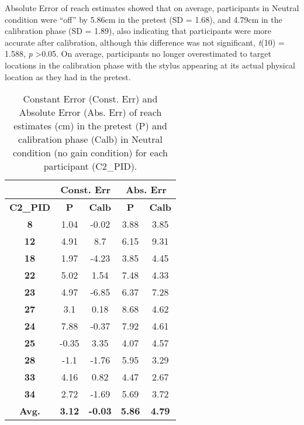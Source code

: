 Absolute Error of reach estimates showed that on average, participants in Neutral condition were “off” by 5.86cm in the pretest (SD = 1.68), and 4.79cm in the calibration phase (SD = 1.89), also indicating that participants were more accurate after calibration, although this difference was not significant, \textit{t}(10) = 1.588, \textit{p} \textgreater 0.05. On average, participants no longer overestimated to target locations in the calibration phase with the stylus appearing at its actual physical location as they had in the pretest.

\begin{table}[h]
	\centering
	\begin{center}
		\begin{tabular}{|c|c|c|c|c|}
			
			\hline
			& \multicolumn{2}{|c}{\textbf{Const. Err}} & \multicolumn{2}{|c|}{\textbf{Abs. Err}} \\ \hline
			\textbf{C2\_PID} & \textbf{P}  & \textbf{Calb}  & \textbf{P}  & \textbf{Calb}  \\ \hline
			\textbf{8}      & 1.04        & -0.02         & 3.88        & 3.85          \\ \hline
			\textbf{12}     & 4.91        & 8.7          & 6.15        & 9.31          \\ \hline
			\textbf{18}     & 1.97        & -4.23         & 3.85        & 4.45          \\ \hline
			\textbf{22}     & 5.02        & 1.54          & 7.48        & 4.33          \\ \hline
			\textbf{23}     & 4.97        & -6.85         & 6.37        & 7.28          \\ \hline
			\textbf{27}     & 3.1         & 0.18          & 8.68        & 4.62          \\ \hline
			\textbf{24}     & 7.88        & -0.37         & 7.92        & 4.61          \\ \hline
			\textbf{25}     & -0.35        & 3.35          & 4.07        & 4.57          \\ \hline
			\textbf{28}     & -1.1        & -1.76         & 5.95        & 3.29          \\ \hline
			\textbf{33}     & 4.16        & 0.82          & 4.47        & 2.67          \\ \hline
			\textbf{34}     & 2.72        & -1.69         & 5.69        & 3.72          \\ \hline
			\textbf{Avg.}   & \textbf{3.12}        & \textbf{-0.03}         & \textbf{5.86}        & \textbf{4.79}          \\ \hline
		\end{tabular}
		\caption{Constant Error (Const. Err) and Absolute Error (Abs. Err) of reach estimates (cm) in the pretest (P) and calibration phase (Calb) in Neutral condition (no gain condition) for each participant (C2\_PID).}\label{tb:tb1}
	\end{center}
\end{table}

